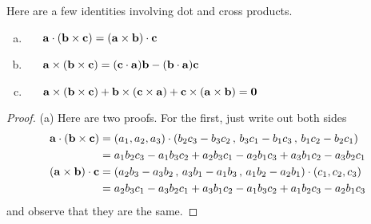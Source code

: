 Here are a few identities involving dot and cross products.
\begin{lemma}\label{lem:tripProd}
\begin{enumerate}[(a)]
\item\ \ \ 
$\mathbf{a}\cdot(\mathbf{b}\times\mathbf{c})=(\mathbf{a}\times\mathbf{b})\cdot\mathbf{c}$
\item\ \ \ 
$\mathbf{a}\times(\mathbf{b}\times\mathbf{c})=(\mathbf{c}\cdot\mathbf{a})\mathbf{b}-(\mathbf{b}\cdot\mathbf{a})\mathbf{c}$
\item\ \ \ 
           $\mathbf{a}\times(\mathbf{b}\times\mathbf{c}) + 
            \mathbf{b}\times(\mathbf{c}\times\mathbf{a}) +
            \mathbf{c}\times(\mathbf{a}\times\mathbf{b}) =\mathbf{0}$
\end{enumerate}
\end{lemma}
\begin{proof} (a)
Here are two proofs.
For the first, just write out both sides
\begin{align*}
\mathbf{a}\cdot(\mathbf{b}\times\mathbf{c})
&=(a_1,a_2,a_3)\cdot(b_2c_3-b_3c_2\,,\,b_3c_1-b_1c_3\,,\,b_1c_2-b_2c_1)\\
&=a_1b_2c_3-a_1b_3c_2+a_2b_3c_1-a_2b_1c_3+a_3b_1c_2-a_3b_2c_1\\
(\mathbf{a}\times\mathbf{b})\cdot\mathbf{c}
&=(a_2b_3-a_3b_2\,,\,a_3b_1-a_1b_3\,,\,a_1b_2-a_2b_1)\cdot(c_1,c_2,c_3)\\
&=a_2b_3c_1-a_3b_2c_1+a_3b_1c_2-a_1b_3c_2+a_1b_2c_3-a_2b_1c_3
\end{align*}
and observe that they are the same.


\end{proof}
